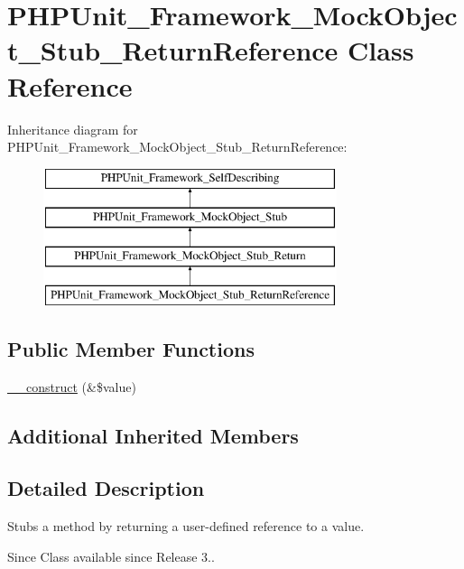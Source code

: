 \hypertarget{class_p_h_p_unit___framework___mock_object___stub___return_reference}{}\section{P\+H\+P\+Unit\+\_\+\+Framework\+\_\+\+Mock\+Object\+\_\+\+Stub\+\_\+\+Return\+Reference Class Reference}
\label{class_p_h_p_unit___framework___mock_object___stub___return_reference}
Inheritance diagram for P\+H\+P\+Unit\+\_\+\+Framework\+\_\+\+Mock\+Object\+\_\+\+Stub\+\_\+\+Return\+Reference\+:\begin{figure}[H]
\begin{center}
\leavevmode
\includegraphics[height=4.000000cm]{class_p_h_p_unit___framework___mock_object___stub___return_reference}
\end{center}
\end{figure}
\subsection*{Public Member Functions}
\begin{DoxyCompactItemize}
\item 
\mbox{\hyperlink{class_p_h_p_unit___framework___mock_object___stub___return_reference_a7da53cf219c768e035e88ac932732fb8}{\+\_\+\+\_\+construct}} (\&\$value)
\end{DoxyCompactItemize}
\subsection*{Additional Inherited Members}


\subsection{Detailed Description}
Stubs a method by returning a user-\/defined reference to a value.

\begin{DoxySince}{Since}
Class available since Release 3.. 
\end{DoxySince}


